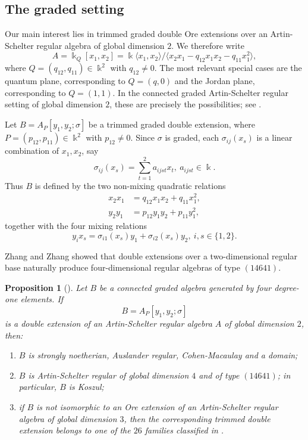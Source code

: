 \documentclass[reqno]{amsart}
\numberwithin{equation}{section}
\newtheorem{proposition}[theorem]{Proposition}
\theoremstyle{definition}
\begin{document}
\subsection{The graded setting}

Our main interest lies in trimmed graded double Ore extensions over an Artin-Schelter regular algebra of global dimension \(2\). We therefore write
\[
A=\Bbbk_Q[x_1,x_2]
=
\Bbbk\langle x_1,x_2\rangle
\Big/
\langle x_2x_1-q_{12}x_1x_2-q_{11}x_1^2\rangle,
\]
where \(Q=(q_{12},q_{11})\in\Bbbk^2\) with \(q_{12}\neq 0\). The most relevant special cases are the quantum plane, corresponding to \(Q=(q,0)\) and the Jordan plane, corresponding to \(Q=(1,1)\). In the connected graded Artin-Schelter regular setting of global dimension \(2\), these are precisely the possibilities; see \cite[Lemma~2.4]{ZZ09}.

Let $B=A_P[y_1,y_2;\sigma]$ be a trimmed graded double extension, where \(P=(p_{12},p_{11})\in\Bbbk^2\) with \(p_{12}\neq 0\). Since \(\sigma\) is graded, each \(\sigma_{ij}(x_s)\) is a linear combination of \(x_1,x_2\), say
\begin{equation}\label{eq:sigma-coefficients}
\sigma_{ij}(x_s)=\sum_{t=1}^2 a_{ijst}x_t,
\ a_{ijst}\in\Bbbk.
\end{equation}
Thus \(B\) is defined by the two non-mixing quadratic relations
\begin{align}
x_2x_1 &= q_{12}x_1x_2+q_{11}x_1^2,\label{eq:base-relation}\\
y_2y_1 &= p_{12}y_1y_2+p_{11}y_1^2,\label{eq:y-relation}
\end{align}
together with the four mixing relations
\begin{equation}\label{eq:mixing-relations}
y_i x_s=\sigma_{i1}(x_s)y_1+\sigma_{i2}(x_s)y_2,
\ i,s\in\{1,2\}.
\end{equation}

Zhang and Zhang showed that double extensions over a two-dimensional regular base naturally produce four-dimensional regular algebras of type \((14641)\).

\begin{proposition}[{\cite[Theorem~0.1]{ZZ09}}]\label{prop:type-14641}
Let \(B\) be a connected graded algebra generated by four degree-one elements. If
\[
B=A_P[y_1,y_2;\sigma]
\]
is a double extension of an Artin-Schelter regular algebra \(A\) of global dimension \(2\), then:
\begin{enumerate}[label=\rm (\arabic*)]
    \item \(B\) is strongly noetherian, Auslander regular, Cohen-Macaulay and a domain;
    \item \(B\) is Artin-Schelter regular of global dimension \(4\) and of type \((14641)\); in particular, \(B\) is Koszul;
    \item if \(B\) is not isomorphic to an Ore extension of an Artin-Schelter regular algebra of global dimension \(3\), then the corresponding trimmed double extension belongs to one of the \(26\) families classified in \cite{ZZ09}.
\end{enumerate}
\end{proposition}
\end{document}
